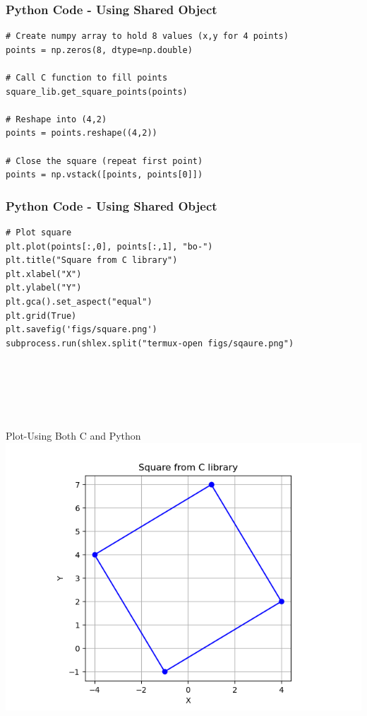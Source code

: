 \documentclass{beamer}
\begin{document}
\begin{frame}[fragile]
    \frametitle{Python Code - Using Shared Object}
    \begin{lstlisting}
# Create numpy array to hold 8 values (x,y for 4 points)
points = np.zeros(8, dtype=np.double)

# Call C function to fill points
square_lib.get_square_points(points)

# Reshape into (4,2)
points = points.reshape((4,2))

# Close the square (repeat first point)
points = np.vstack([points, points[0]])

\end{lstlisting}
\end{frame}
\begin{frame}[fragile]
    \frametitle{Python Code - Using Shared Object}
    \begin{lstlisting}
# Plot square
plt.plot(points[:,0], points[:,1], "bo-")
plt.title("Square from C library")
plt.xlabel("X")
plt.ylabel("Y")
plt.gca().set_aspect("equal")
plt.grid(True)
plt.savefig('figs/square.png')
subprocess.run(shlex.split("termux-open figs/sqaure.png")






\end{lstlisting}
\end{frame}



\begin{frame}{Plot-Using Both C and Python}
    \centering
    \includegraphics[width=\columnwidth, height=0.8\textheight, keepaspectratio]{figs/square.png}     
\end{frame}
\end{document}
